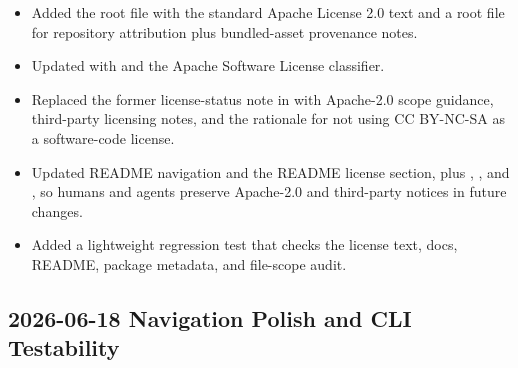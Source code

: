 \begin{itemize}
\item Added the root \texttt{} file with the standard Apache License 2.0 text and a root \texttt{} file for repository attribution plus bundled-asset provenance notes.
\item Updated \texttt{} with \texttt{} and the Apache Software License classifier.
\item Replaced the former license-status note in \texttt{} with Apache-2.0 scope guidance, third-party licensing notes, and the rationale for not using CC BY-NC-SA as a software-code license.
\item Updated README navigation and the README license section, plus \texttt{}, \texttt{}, and \texttt{}, so humans and agents preserve Apache-2.0 and third-party notices in future changes.
\item Added a lightweight regression test that checks the license text, docs, README, package metadata, and file-scope audit.
\end{itemize}

\subsection*{2026-06-18 Navigation Polish and CLI Testability}

